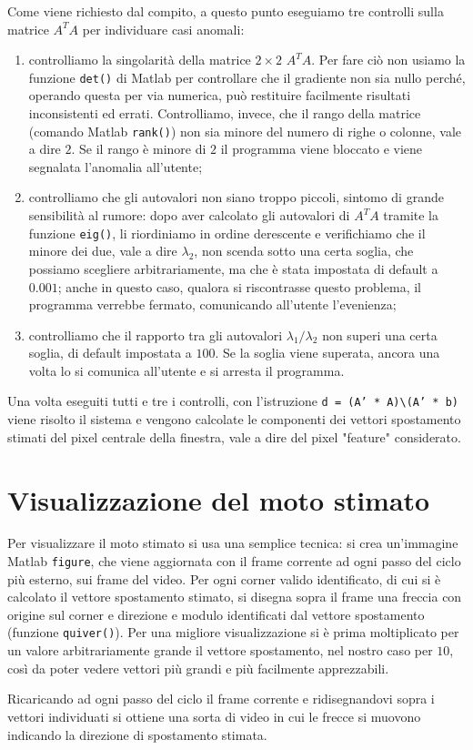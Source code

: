 \documentclass{article}
\begin{document}
Come viene richiesto dal compito, a questo punto eseguiamo tre controlli sulla matrice $A^T A$ per individuare casi anomali:
\begin{enumerate}
\item
controlliamo la singolarità della matrice $2 \times 2$ $A^TA$. Per fare ciò non usiamo la funzione \texttt{det()} di Matlab per controllare che il gradiente non sia nullo perché, operando questa per via numerica, può restituire facilmente risultati inconsistenti ed errati. Controlliamo, invece, che il rango della matrice (comando Matlab \texttt{rank()}) non sia minore del numero di righe o colonne, vale a dire $2$. Se il rango è minore di $2$ il programma viene bloccato e viene segnalata l'anomalia all'utente;

\item
controlliamo che gli autovalori non siano troppo piccoli, sintomo di grande sensibilità al rumore: dopo aver calcolato gli autovalori di $A^TA$ tramite la funzione \texttt{eig()}, li riordiniamo in ordine derescente e verifichiamo che il minore dei due, vale a dire $\lambda_2$, non scenda sotto una certa soglia, che possiamo scegliere arbitrariamente, ma che è stata impostata di default a $0.001$; anche in questo caso, qualora si riscontrasse questo problema, il programma verrebbe fermato, comunicando all'utente l'evenienza;

\item
controlliamo che il rapporto tra gli autovalori $\lambda_1 / \lambda_2$ non superi una certa soglia, di default impostata a $100$. Se la soglia viene superata, ancora una volta lo si comunica all'utente e si arresta il programma.
\end{enumerate}

Una volta eseguiti tutti e tre i controlli, con l'istruzione \texttt{d = (A' * A)\textbackslash (A' * b)} viene risolto il sistema e vengono calcolate le componenti dei vettori spostamento stimati del pixel centrale della finestra, vale a dire del pixel "feature" considerato.

\section*{Visualizzazione del moto stimato}
Per visualizzare il moto stimato si usa una semplice tecnica: si crea un'immagine Matlab \texttt{figure}, che viene aggiornata con il frame corrente ad ogni passo del ciclo più esterno, sui frame del video. Per ogni corner valido identificato, di cui si è calcolato il vettore spostamento stimato, si disegna sopra il frame una freccia con origine sul corner e direzione e modulo identificati dal vettore spostamento (funzione \texttt{quiver()}). Per una migliore visualizzazione si è prima moltiplicato per un valore arbitrariamente grande il vettore spostamento, nel nostro caso per $10$, così da poter vedere vettori più grandi e più facilmente apprezzabili.

Ricaricando ad ogni passo del ciclo il frame corrente e ridisegnandovi sopra i vettori individuati si ottiene una sorta di video in cui le frecce si muovono indicando la direzione di spostamento stimata.
\end{document}
